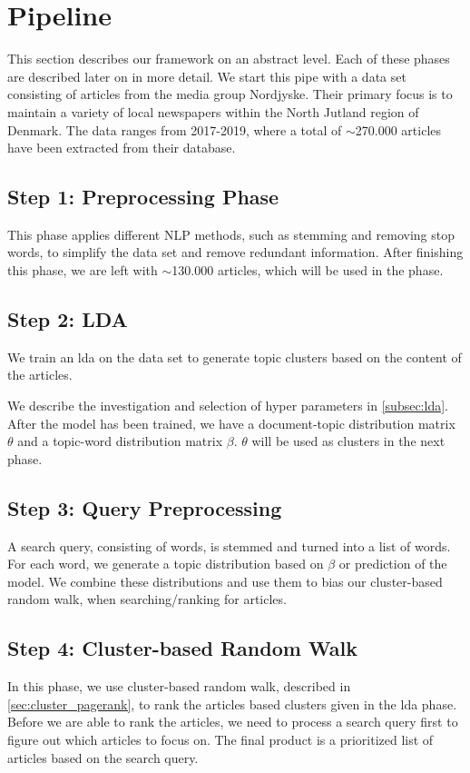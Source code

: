 \section{Pipeline}
This section describes our framework on an abstract level.
Each of these phases are described later on in more detail. 
We start this pipe with a data set consisting of articles from the media group Nordjyske. Their primary focus is to maintain a variety of local newspapers within the North Jutland region of Denmark. 
The data ranges from 2017-2019, where a total of $\sim$270.000 articles have been extracted from their database.

\subsection*{Step 1: Preprocessing Phase}
This phase applies different \gls{NLP} methods, such as stemming and removing stop words, to simplify the data set and remove redundant information.
After finishing this phase, we are left with $\sim$130.000 articles, which will be used in the phase.

\subsection*{Step 2: LDA}
We train an \acrfull{lda} on the data set to generate topic clusters based on the content of the articles. 

We describe the investigation and selection of hyper parameters in \autoref{subsec:lda}. 
After the model has been trained, we have a document-topic distribution matrix $\theta$ and a topic-word distribution matrix $\beta$.
$\theta$ will be used as clusters in the next phase.

\subsection*{Step 3: Query Preprocessing}
A search query, consisting of words, is stemmed and turned into a list of words.
For each word, we generate a topic distribution based on $\beta$ or prediction of the model.
We combine these distributions and use them to bias our cluster-based random walk, when searching/ranking for articles.


\subsection*{Step 4: Cluster-based Random Walk}
In this phase, we use cluster-based random walk, described in \autoref{sec:cluster_pagerank}, to rank the articles based clusters given in the \gls{lda} phase.
Before we are able to rank the articles, we need to process a search query first to figure out which articles to focus on.
The final product is a prioritized list of articles based on the search query.


%

